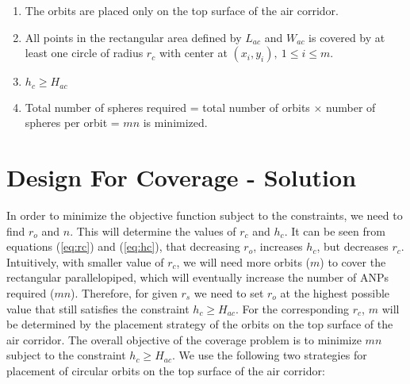 \documentclass[10pt]{IEEEtran}
\begin{document}
\begin{enumerate}
	\item The orbits are placed only on the top surface of the air corridor.
	\item All points in the rectangular area defined by $L_{ac}$ and $W_{ac}$ is covered by at least one circle of radius $r_{c}$ with center at $(x_{i},y_{i}),~1\leq i\leq m$.
	\item $h_{c} \geq H_{ac}$
	\item Total number of spheres required = total number of orbits $\times$ number of spheres per orbit = $mn$ is minimized.
\end{enumerate}

\section{Design For Coverage - Solution}
\label{sec:coverageSolution}

In order to minimize the objective function subject to the constraints, we need to find $r_{o}$ and $n$. This will determine the values of $r_{c}$ and $h_{c}$. It can be seen from equations (\ref{eq:rc}) and (\ref{eq:hc}), that decreasing $r_{o}$, increases $h_{c}$, but decreases $r_{c}$. Intuitively, with smaller value of $r_{c}$, we will need more orbits ($m$) to cover the rectangular parallelopiped, which will eventually increase the number of ANPs required ($mn$). Therefore, for given $r_{s}$ we need to set $r_{o}$ at the highest possible value that still satisfies the constraint $h_{c} \geq H_{ac}$. For the corresponding $r_{c}$, $m$ will be determined by the placement strategy of the orbits on the top surface of the air corridor. The overall objective of the coverage problem is to minimize $mn$ subject to the constraint $h_{c} \geq H_{ac}$.  We use the following two strategies for placement of circular orbits on the top surface of the air corridor:
\end{document}
